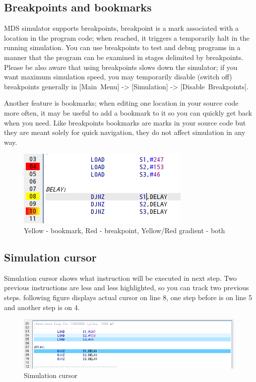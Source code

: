     \subsection{Breakpoints and bookmarks}
        MDS simulator supports breakpoints, breakpoint is a mark associated with a location in the program code; when
        reached, it triggers a temporarily halt in the running simulation. You can use breakpoints to test and debug
        programs in a manner that the program can be examined in stages delimited by breakpoints. Please be also aware
        that using breakpoints slows down the simulator; if you want maximum simulation speed, you may temporarily
        disable (switch off) breakpoints generally in [Main~Menu] -> [Simulation] -> [Disable~Breakpoints].

        Another feature is bookmarks; when editing one location in your source code more often, it may be useful to add
        a bookmark to it so you can quickly get back when you need. Like breakpoints bookmarks are marks in your source
        code but they are meant solely for quick navigation, they do not affect simulation in any way.

        \begin{figure}[h!]
            \centering
            \includegraphics[width=.4\textwidth]{img/breakpoints1.png}
            \caption{Yellow - bookmark, Red - breakpoint, Yellow/Red gradient - both}
        \end{figure}

    \subsection{Simulation cursor}
        Simulation cursor shows what instruction will be executed in next step. Two previous instructions are less and
        less highlighted, so you can track two previous steps. following figure displays actual cursor on line 8, one
        step before is on line 5 and another step is on 4.
        \begin{figure}[h!]
            \centering
            \includegraphics[width=\textwidth]{img/simulationcursor1.png}
            \caption{Simulation cursor}
        \end{figure}

